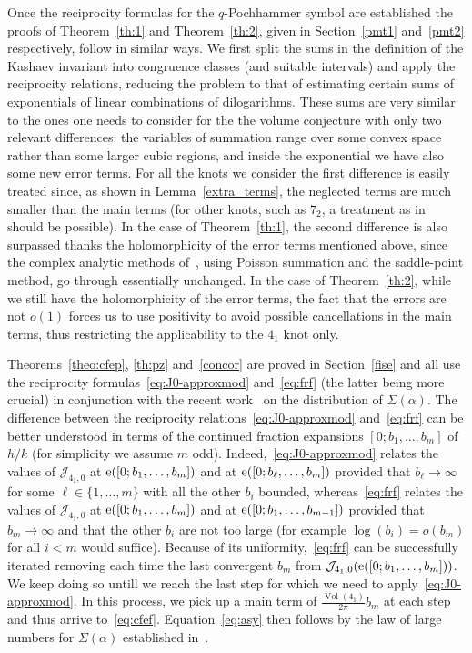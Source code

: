 \documentclass[11pt]{amsart}
\newcommand{\Sm}{\Sigma}
\newcommand{\J}{\mathcal{J}}
\theoremstyle{definition}
\newcommand{\pr}[1]{\mathchoice{\left( #1\right)}{(#1)}{(#1)}{(#1)}}
\newcommand{\e}[1][]{\ifthenelse{\equal{#1}{}}{{\rm e}}{\operatorname{e}\pr{ #1}}}
\DeclareMathOperator{\Vol}{Vol}
\newcommand{\1}{{\mathbf 1}}
\let\originalleft\left
\let\originalright\right
\renewcommand{\left}{\mathopen{}\mathclose\bgroup\originalleft}
\renewcommand{\right}{\aftergroup\egroup\originalright}
\numberwithin{equation}{section}
\begin{document}
Once the reciprocity formulas for the $q$-Pochhammer symbol are established the proofs of Theorem~\ref{th:1} and Theorem~\ref{th:2}, given in Section~\ref{pmt1} and~\ref{pmt2} respectively, follow in similar ways. We first split the sums in the definition of the Kashaev invariant into congruence classes (and suitable intervals) and apply the reciprocity relations, reducing the problem to that of estimating certain sums of exponentials of linear combinations of dilogarithms. These sums are very similar to the ones one needs to consider for the the volume conjecture with only two relevant differences: the variables of summation range over some convex space rather than some larger cubic regions, and inside the exponential we have also some new error terms. For all the knots we consider the first difference is easily treated since, as shown in Lemma~\ref{extra_terms}, the neglected terms are much smaller than the main terms (for other knots, such as $7_2$, a treatment as in~\cite[Section 8]{Ohtsuki7} should be possible). In the case of Theorem~\ref{th:1}, the second difference is also surpassed thanks the holomorphicity of the error terms mentioned above, since the complex analytic methods of~\cite{Ohtsuki52,OhtsukiYokota6,Ohtsuki7}, using Poisson summation and the saddle-point method, go through essentially unchanged. In the case of Theorem~\ref{th:2}, while we still have the holomorphicity of the error terms, the fact that the errors are not $o(1)$ forces us to use positivity to avoid possible cancellations in the main terms, thus restricting the applicability to the $4_1$ knot only.

\medskip

Theorems~\ref{theo:cfep}, \ref{th:pz} and~\ref{concor} are proved in Section~\ref{fise} and all use the reciprocity formulas~\eqref{eq:J0-approxmod}  and~\eqref{eq:frf} (the latter being more crucial) in conjunction with the recent work~\cite{BettinDrappeau} on the distribution of $\Sm(\alpha)$.
%
The difference between the reciprocity relations~\eqref{eq:J0-approxmod}  and~\eqref{eq:frf} can be better understood in terms of the continued fraction expansions $[0;b_1,\dots,b_m]$ of $h/k$ (for simplicity we assume $m$ odd). Indeed,~\eqref{eq:J0-approxmod} relates the values of $\J_{4_1,0}$ at $\e[{[0;b_1,\dots,b_m]}]$ and at $\e[{[0;b_\ell,\dots,b_m]}]$ provided that $b_\ell\to\infty$ for some $\ell\in\{1,\dots,m\}$ with all the other $b_i$ bounded, whereas~\eqref{eq:frf} relates the values of $\J_{4_1,0}$ at $\e[{[0;b_1,\dots,b_m]}]$ and at $\e[{[0;b_1,\dots,b_{m-1}]}]$ provided that $b_m\to\infty$ and that the other $b_i$ are not too large (for example $\log(b_i)=o(b_m)$ for all $i<m$ would suffice). 
%
Because of its uniformity,~\eqref{eq:frf} can be successfully iterated removing each time the last convergent $b_m$ from $\J_{4_1,0}(\e[{[0;b_1,\dots,b_m]}])$. We keep doing so untill we reach the last step for which we need to apply~\eqref{eq:J0-approxmod}. In this process, we pick up a main term of $\frac{\Vol(4_1)}{2\pi}b_m$ at each step and thus arrive to~\eqref{eq:cfef}. Equation~\eqref{eq:asy} then follows by the law of large numbers for $\Sm(\alpha)$ established in~\cite{BettinDrappeau}. 
\end{document}
